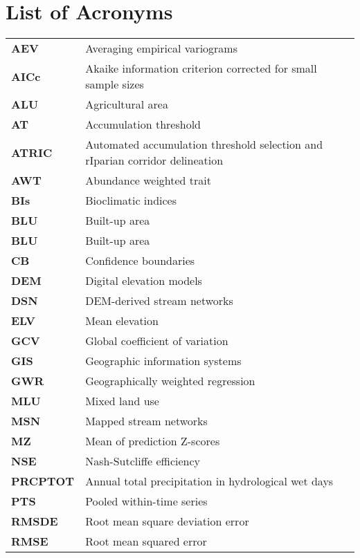 \chapter{List of Acronyms}
\label{List of Acronyms}

\begin{table}[hp!]
\label{Table 1}

\begin{tabular}{>{\raggedright\arraybackslash}p{2.0cm}>{\raggedright\arraybackslash}p{12.0cm}}

\textbf{AEV} & Averaging empirical variograms\\
\textbf{AICc} & Akaike information criterion corrected for small sample sizes\\
\textbf{ALU} & Agricultural area\\
\textbf{AT} & Accumulation threshold\\
\textbf{ATRIC} & Automated accumulation threshold selection and rIparian corridor delineation\\
\textbf{AWT} & Abundance weighted trait\\
\textbf{BIs} & Bioclimatic indices\\
\textbf{BLU} & Built-up area\\
\textbf{BLU} & Built-up area\\
\textbf{CB} & Confidence boundaries\\
\textbf{DEM} & Digital elevation models\\
\textbf{DSN} & DEM-derived stream networks\\
\textbf{ELV} & Mean elevation\\
\textbf{GCV} & Global coefficient of variation\\
\textbf{GIS} & Geographic information systems\\
\textbf{GWR} & Geographically weighted regression\\
\textbf{MLU} & Mixed land use\\
\textbf{MSN} & Mapped stream networks\\
\textbf{MZ} & Mean of prediction Z-scores\\
\textbf{NSE} & Nash-Sutcliffe efficiency\\
\textbf{PRCPTOT} & Annual total precipitation in hydrological wet days\\
\textbf{PTS} & Pooled within-time series\\
\textbf{RMSDE} & Root mean square deviation error\\
\textbf{RMSE} & Root mean squared error\\

\end{tabular}
\end{table}
